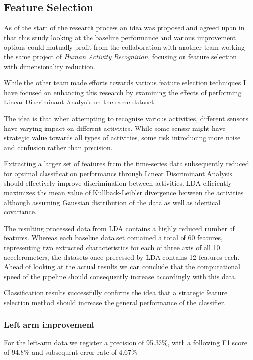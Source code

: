 \documentclass{sig-alternate}
\begin{document}
\subsection{Feature Selection}
As of the start of the research process an idea was proposed and agreed upon in that this study looking at the baseline performance and various improvement options could mutually profit from the collaboration with another team working the same project of \textit{Human Activity Recognition}, focusing on feature selection with dimensionality reduction.

While the other team made efforts towards various feature selection techniques I have focused on enhancing this research by examining the effects of performing Linear Discriminant Analysis on the same dataset.

The idea is that when attempting to recognize various activities, different sensors have varying impact on different activities. While some sensor might have strategic value towards all types of activities, some risk introducing more noise and confusion rather than precision.

Extracting a larger set of features from the time-series data subsequently reduced for optimal classification performance through Linear Discriminant Analysis should effectively improve discrimination between activities. LDA efficiently maximizes the mean value of Kullback-Leibler divergence between the activities although assuming Gaussian distribution of the data as well as identical covariance.

The resulting processed data from LDA contains a highly reduced number of features. Whereas each baseline data set contained a total of 60 features, representing two extracted characteristics for each of three axis of all 10 accelerometers, the datasets once processed by LDA contains 12 features each. Ahead of looking at the actual results we can conclude that the computational speed of the pipeline should consequently increase accordingly with this data.

Classification results successfully confirms the idea that a strategic feature selection method should increase the general performance of the classifier.  

\subsubsection{Left arm improvement}
For the left-arm data we register a precision of 95.33\%, with a following F1 score of 94.8\% and subsequent error rate of 4.67\%. 
\end{document}
